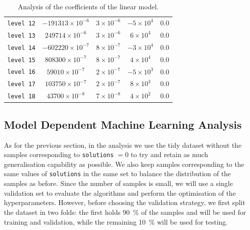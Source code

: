 \begin{table}[htbp]
\begin{tabular}{@{}ccccc@{}}
  \texttt{level 12}  & $-191313 \times 10^{-6}$    & $3 \times 10^{-6}$      & $-5 \times 10^4$     & 0.0                                       \\
  \texttt{level 13}  & $249714 \times 10^{-6}$     & $3 \times 10^{-6}$      & $6 \times 10^4$      & 0.0                                       \\
  \texttt{level 14}  & $-602220 \times 10^{-7}$    & $8 \times 10^{-7}$      & $-3 \times 10^4$     & 0.0                                       \\
  \texttt{level 15}  & $808300 \times 10^{-7}$     & $8 \times 10^{-7}$      & $4 \times 10^4$      & 0.0                                       \\
  \texttt{level 16}  & $59010 \times 10^{-7}$      & $2 \times 10^{-7}$      & $-5 \times 10^3$     & 0.0                                       \\
  \texttt{level 17}  & $103750 \times 10^{-7}$     & $2 \times 10^{-7}$      & $8 \times 10^3$      & 0.0                                       \\
  \texttt{level 18}  & $43700 \times 10^{-8}$      & $7 \times 10^{-8}$      & $4 \times 10^2$      & 0.0                                       \\
  \bottomrule
  \end{tabular}%
  \caption{Analysis of the coefficients of the linear model.}
  \label{tab:lumps:anova}
\end{table}


\subsection{Model Dependent Machine Learning Analysis}

As for the previous section, in the \ml analysis we use the tidy dataset without the samples corresponding to \texttt{solutions} $= 0$ to try and retain as much generalisation capability as possible.
We also keep samples corresponding to the same values of \texttt{solutions} in the same set to balance the distribution of the samples as before.
Since the number of samples is small, we will use a single validation set to evaluate the algorithms and perform the optimisation of the hyperparameters.
However, before choosing the validation strategy, we first split the dataset in two folds: the first holds \SI{90}{\percent} of the samples and will be used for training and validation, while the remaining \SI{10}{\percent} will be used for testing.

